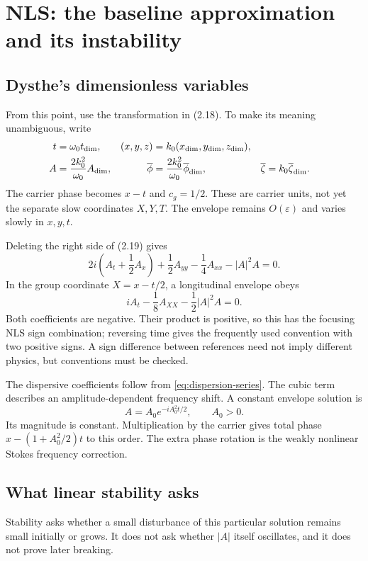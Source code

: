 \section{NLS: the baseline approximation and its instability}
\label{sec:nls}
\subsection{Dysthe's dimensionless variables}
\label{sec:scaling}
From this point, use the transformation in (2.18). To make its meaning
unambiguous, write
\begin{align*}
 t&=\omega_0t_{\rm dim},& (x,y,z)&=k_0(x_{\rm dim},y_{\rm dim},z_{\rm dim}),\\
 A&=\frac{2k_0^2}{\omega_0}A_{\rm dim},&
 \overline{\phi}&=\frac{2k_0^2}{\omega_0}\overline{\phi}_{\rm dim},&
 \overline{\zeta}&=k_0\overline{\zeta}_{\rm dim}.
\end{align*}
The carrier phase becomes $x-t$ and $c_g=1/2$. These are carrier units,
not yet the separate slow coordinates $X,Y,T$. The envelope remains
$O(\varepsilon)$ and varies slowly in $x,y,t$.

Deleting the right side of (2.19) gives
\begin{equation}\label{eq:nls}
 2i\left(A_t+\frac12A_x\right)
 +\frac12A_{yy}-\frac14A_{xx}-|A|^2A=0.
\end{equation}
In the group coordinate $X=x-t/2$, a longitudinal envelope obeys
\[
 iA_t-\frac18A_{XX}-\frac12|A|^2A=0.
\]
Both coefficients are negative. Their product is positive, so this has
the focusing NLS sign combination; reversing time gives the frequently
used convention with two positive signs. A sign difference between
references need not imply different physics, but conventions must be checked.

The dispersive coefficients follow from \eqref{eq:dispersion-series}.
The cubic term describes an amplitude-dependent frequency shift. A
constant envelope solution is
\begin{equation}\label{eq:plane-wave}
 A=A_0e^{-iA_0^2t/2},\qquad A_0>0.
\end{equation}
Its magnitude is constant. Multiplication by the carrier gives total phase
$x-(1+A_0^2/2)t$ to this order. The extra phase rotation is the weakly
nonlinear Stokes frequency correction.

\subsection{What linear stability asks}
Stability asks whether a small disturbance of this particular solution
remains small initially or grows. It does not ask whether $|A|$ itself
oscillates, and it does not prove later breaking.

